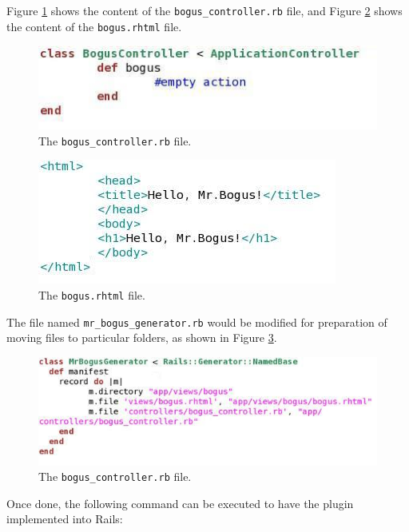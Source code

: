 \documentclass{article}
\begin{document}
Figure \ref{fig:instruction-3} shows the content of the \texttt{bogus\_controller.rb} file, and Figure \ref{fig:instruction-4} shows the content of the \texttt{bogus.rhtml} file.

\begin{figure}
    \centering
    \includegraphics[scale=0.7]{fig/instruction-3.jpg}
    \caption{The \texttt{bogus\_controller.rb} file.}
    \label{fig:instruction-3}
\end{figure}

\begin{figure}
    \centering
    \includegraphics[scale=0.7]{fig/instruction-4.jpg}
    \caption{The \texttt{bogus.rhtml} file.}
    \label{fig:instruction-4}
\end{figure}

The file named \texttt{mr\_bogus\_generator.rb} would be modified for preparation of moving files to particular folders, as shown in Figure \ref{fig:instruction-5}.

\begin{figure}
    \centering
    \includegraphics[scale=0.7]{fig/instruction-5.jpg}
    \caption{The \texttt{bogus\_controller.rb} file.}
    \label{fig:instruction-5}
\end{figure}

Once done, the following command can be executed to have the plugin implemented into Rails: 
\end{document}

